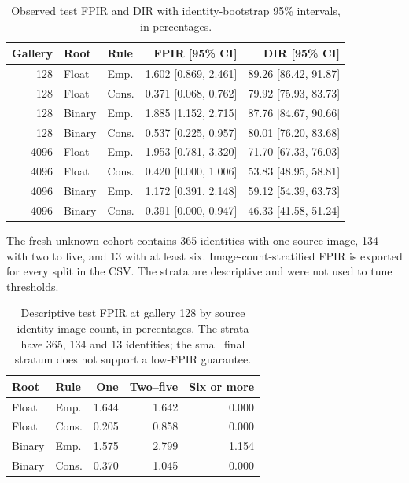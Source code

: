 \begin{table}[H]
\caption{Observed test FPIR and DIR with identity-bootstrap 95\% intervals, in percentages.}
\label{tab:open_ci}\centering\small
\setlength{\tabcolsep}{3pt}
\begin{tabular}{rllrr}
\toprule
Gallery & Root & Rule & FPIR [95\% CI] & DIR [95\% CI] \\
\midrule
128 & Float & Emp. & 1.602 [0.869, 2.461] & 89.26 [86.42, 91.87] \\
128 & Float & Cons. & 0.371 [0.068, 0.762] & 79.92 [75.93, 83.73] \\
128 & Binary & Emp. & 1.885 [1.152, 2.715] & 87.76 [84.67, 90.66] \\
128 & Binary & Cons. & 0.537 [0.225, 0.957] & 80.01 [76.20, 83.68] \\
4096 & Float & Emp. & 1.953 [0.781, 3.320] & 71.70 [67.33, 76.03] \\
4096 & Float & Cons. & 0.420 [0.000, 1.006] & 53.83 [48.95, 58.81] \\
4096 & Binary & Emp. & 1.172 [0.391, 2.148] & 59.12 [54.39, 63.73] \\
4096 & Binary & Cons. & 0.391 [0.000, 0.947] & 46.33 [41.58, 51.24] \\
\bottomrule
\end{tabular}
\end{table}

The fresh unknown cohort contains 365 identities with one source image, 134 with two to five, and 13 with at least six. Image-count-stratified FPIR is exported for every split in the CSV. The strata are descriptive and were not used to tune thresholds.

\begin{table}[H]
\caption{Descriptive test FPIR at gallery 128 by source identity image count, in percentages. The strata have 365, 134 and 13 identities; the small final stratum does not support a low-FPIR guarantee.}
\label{tab:unknown_strata}\centering\small
\setlength{\tabcolsep}{3pt}
\begin{tabular}{llrrr}
\toprule
Root & Rule & One & Two--five & Six or more \\
\midrule
Float & Emp. & 1.644 & 1.642 & 0.000 \\
Float & Cons. & 0.205 & 0.858 & 0.000 \\
Binary & Emp. & 1.575 & 2.799 & 1.154 \\
Binary & Cons. & 0.370 & 1.045 & 0.000 \\
\bottomrule
\end{tabular}
\end{table}
